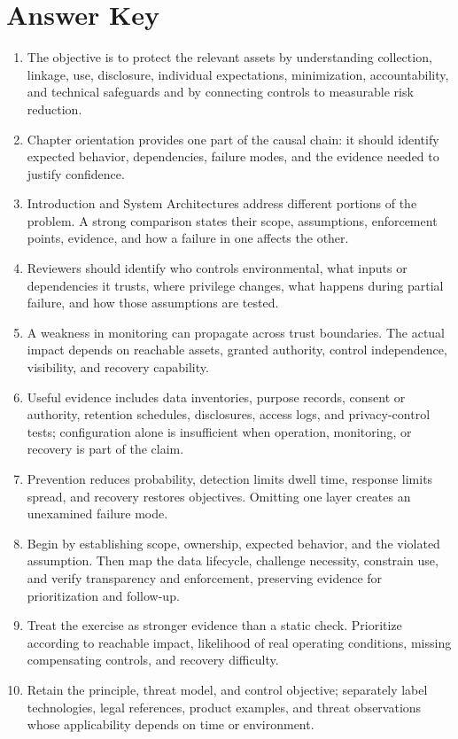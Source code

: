 \documentclass[11pt]{article}
\begin{document}
\section*{Answer Key}
\begin{enumerate}
\item The objective is to protect the relevant assets by understanding collection, linkage, use, disclosure, individual expectations, minimization, accountability, and technical safeguards and by connecting controls to measurable risk reduction.
\item Chapter orientation provides one part of the causal chain: it should identify expected behavior, dependencies, failure modes, and the evidence needed to justify confidence.
\item Introduction and System Architectures address different portions of the problem. A strong comparison states their scope, assumptions, enforcement points, evidence, and how a failure in one affects the other.
\item Reviewers should identify who controls environmental, what inputs or dependencies it trusts, where privilege changes, what happens during partial failure, and how those assumptions are tested.
\item A weakness in monitoring can propagate across trust boundaries. The actual impact depends on reachable assets, granted authority, control independence, visibility, and recovery capability.
\item Useful evidence includes data inventories, purpose records, consent or authority, retention schedules, disclosures, access logs, and privacy-control tests; configuration alone is insufficient when operation, monitoring, or recovery is part of the claim.
\item Prevention reduces probability, detection limits dwell time, response limits spread, and recovery restores objectives. Omitting one layer creates an unexamined failure mode.
\item Begin by establishing scope, ownership, expected behavior, and the violated assumption. Then map the data lifecycle, challenge necessity, constrain use, and verify transparency and enforcement, preserving evidence for prioritization and follow-up.
\item Treat the exercise as stronger evidence than a static check. Prioritize according to reachable impact, likelihood of real operating conditions, missing compensating controls, and recovery difficulty.
\item Retain the principle, threat model, and control objective; separately label technologies, legal references, product examples, and threat observations whose applicability depends on time or environment.
\end{enumerate}
\end{document}
